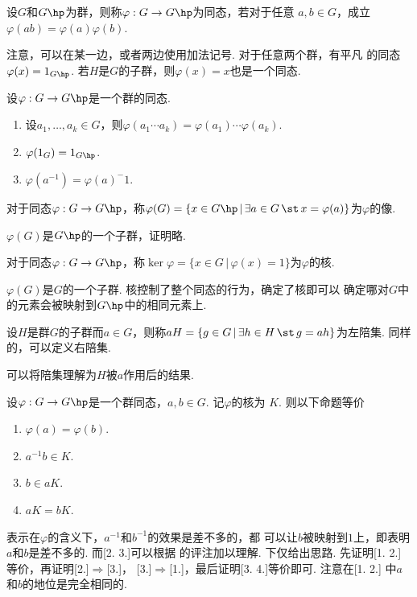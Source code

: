   \begin{defi}
    设$G$和$G\hp$为群，则称$\varphi:G\to G\hp$为同态，若对于任意
    $a, b\in G$，成立$\varphi(ab) = \varphi(a)\varphi(b)$.
  \end{defi}
  \remark
    注意，可以在某一边，或者两边使用加法记号. 对于任意两个群，有平凡
    的同态$\varphi(x) = 1_{G\hp}$. 若$H$是$G$的子群，则$\varphi(x)
    =x$也是一个同态.

  \begin{thm}
    设$\varphi: G\to G\hp$是一个群的同态.
    \begin{enumerate}
      \item 设$a_1,\dots, a_k\in G$，则$\varphi(a_1\cdots a_k)
        =\varphi(a_1)\cdots\varphi(a_k)$.
      \item $\varphi(1_G) = 1_{G\hp}$.
      \item $\varphi(a^{-1}) = \varphi(a)^-1$.
    \end{enumerate}
  \end{thm}

  \begin{defi}[像]
    对于同态$\varphi:G\to G\hp$，称$\varphi(G) = \{x\in G\hp\,|\,
    \exists a\in G \,\st\, x=\varphi(a)\}$为$\varphi$的像.
  \end{defi}
  \remark
    $\varphi(G)$是$G\hp$的一个子群，证明略.

  \begin{defi}[核]
    对于同态$\varphi:G\to G\hp$，称$\ker\varphi = \{x\in G\,|\,
    \varphi(x)=1\}$为$\varphi$的核.
  \end{defi}
  \remark
    $\varphi(G)$是$G$的一个子群. 核控制了整个同态的行为，确定了核即可以
    确定哪对$G$中的元素会被映射到$G\hp$中的相同元素上.

  \begin{defi}[陪集]
    \label{defi: 陪集}
    设$H$是群$G$的子群而$a\in G$，则称$aH=\{g\in G\,|\,
    \exists h\in H\,\st\, g=ah\}$为左陪集. 同样的，可以定义右陪集.
  \end{defi}
  \remark
    可以将陪集理解为$H$被$a$作用后的结果.

  \begin{thm}
    设$\varphi:G\to G\hp$是一个群同态，$a,b\in G$. 记$\varphi$的核为
    $K$. 则以下命题等价
    \begin{enumerate}
      \item $\varphi(a)=\varphi(b)$.
      \item $a^{-1}b\in K$.
      \item $b\in aK$.
      \item $aK = bK$.
    \end{enumerate}
  \end{thm}
  \remark
    [2.]表示在$\varphi$的含义下，$a^{-1}$和$b^{-1}$的效果是差不多的，都
    可以让$b$被映射到$1$上，即表明$a$和$b$是差不多的. 而[2. 3.]可以根据
    的评注加以理解.
  \proof
    下仅给出思路. 先证明[1. 2.]等价，再证明[2.]$\Rightarrow$[3.]，
    [3.]$\Rightarrow$[1.]，最后证明[3. 4.]等价即可. 注意在[1. 2.]
    中$a$和$b$的地位是完全相同的.

